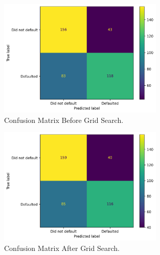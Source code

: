 \documentclass{article}
\begin{document}
\begin{figure}[H]
    \centering
    \includegraphics[width=0.7\textwidth]{../figures/confusion_matrix_pre_gridSearch.png}
    \caption{Confusion Matrix Before Grid Search.}
    \label{fig:confusion-pre-grid}
\end{figure}

\begin{figure}[H]
    \centering
    \includegraphics[width=0.7\textwidth]{../figures/confusion_matrix_post_gridSearch.png}
    \caption{Confusion Matrix After Grid Search.}
    \label{fig:confusion-post-grid}
\end{figure}
\end{document}
